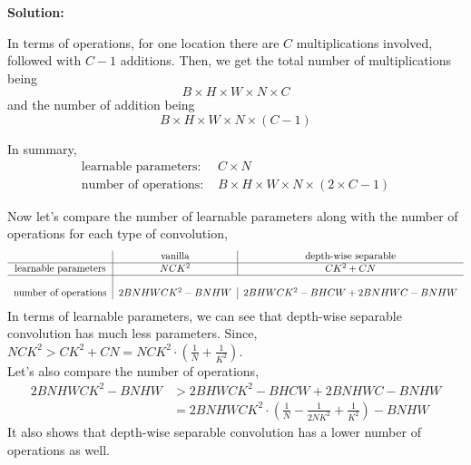 \documentclass{article}
\newenvironment{solution}
  {\par\noindent\textbf{Solution:}\par}
  {\par}
\begin{document}
\begin{solution}
In terms of operations, for one location there are $C$ multiplications involved, followed with $C-1$ additions. Then, we get the total number of
multiplications being  \[ B \times H \times W \times N \times C \]
and the number of addition being \[  B \times H \times W \times N \times (C-1)\]

In summary,
  \[
    \begin{aligned}
      \text{learnable parameters: }& C \times N \\ 
      \text{number of operations: } &B \times H \times W \times N \times (2 \times C - 1)
    \end{aligned}
  \]


Now let's compare the number of learnable parameters along with the number of operations for each type of convolution,
\[
\begin{tabular}{c|c|c}
 & \text{vanilla} & \text{depth-wise separable} \\
  \hline
  learnable parameters &  $NCK^2$ & $CK^2 +CN $ \\ \hline \\ 
  number of operations & $2BNHWCK^2 - BNHW$ & $2BHWCK^2 - BHCW + 2BNHWC - BNHW$ 
\end{tabular}
\]
In terms of learnable parameters, we can see that depth-wise separable convolution has much less parameters. Since, $ NCK^2 > CK^2 + CN = NCK^2 \cdot ( \frac{1}{N} + \frac{1}{K^2} )$. 
\\ 

Let's also compare the number of operations,
\[ 
  \begin{aligned}
    2BNHWCK^2 - BNHW &> 2BHWCK^2 - BHCW + 2BNHWC - BNHW \\ 
                     &= 2BNHWCK^2 \cdot (\frac{1}{N} - \frac{1}{2NK^2} + \frac{1}{K^2}) - BNHW
\end{aligned}
\]
It also shows that depth-wise separable convolution has a lower number of operations as well.
\end{solution}
\end{document}
